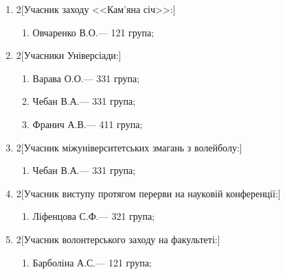 \documentclass[
	a4paper,
	12pt,
	oneside,
	draft
]{extreport}
\begin{document}
\begin{enumerate}[topsep=0pt,itemsep=-1ex,partopsep=1ex,parsep=1ex]
\item 
\begin{multicols}{2}[Учасник заходу <<Кам'яна січ>>:] 
\begin{enumerate}[topsep=0pt,itemsep=-1ex,partopsep=1ex,parsep=1ex,label=\arabic*.]
\item Овчаренко В.О.\hfill --- 121 група;
\end{enumerate}
\end{multicols}

\item 
\begin{multicols}{2}[Учасники Універсіади:] 
\begin{enumerate}[topsep=0pt,itemsep=-1ex,partopsep=1ex,parsep=1ex,label=\arabic*.]
\item Варава О.О.\hfill --- 331 група;
\item Чебан В.А.\hfill --- 331 група;
\item Франич А.В.\hfill --- 411 група;
\end{enumerate}
\end{multicols}

\item 
\begin{multicols}{2}[Учасник міжуніверситетських змагань з волейболу:] 
\begin{enumerate}[topsep=0pt,itemsep=-1ex,partopsep=1ex,parsep=1ex,label=\arabic*.]
\item Чебан В.А.\hfill --- 331 група;
\end{enumerate}
\end{multicols}

\item 
\begin{multicols}{2}[Учасник виступу протягом перерви на науковій конференції:] 
\begin{enumerate}[topsep=0pt,itemsep=-1ex,partopsep=1ex,parsep=1ex,label=\arabic*.]
\item Ліфенцова С.Ф.\hfill --- 321 група;
\end{enumerate}
\end{multicols}

\item 
\begin{multicols}{2}[Учасник волонтерського заходу на факультеті:] 
\begin{enumerate}[topsep=0pt,itemsep=-1ex,partopsep=1ex,parsep=1ex,label=\arabic*.]
\item Барболіна А.С.\hfill --- 121 група;
\end{enumerate}
\end{multicols}

\end{enumerate}
\end{document}
